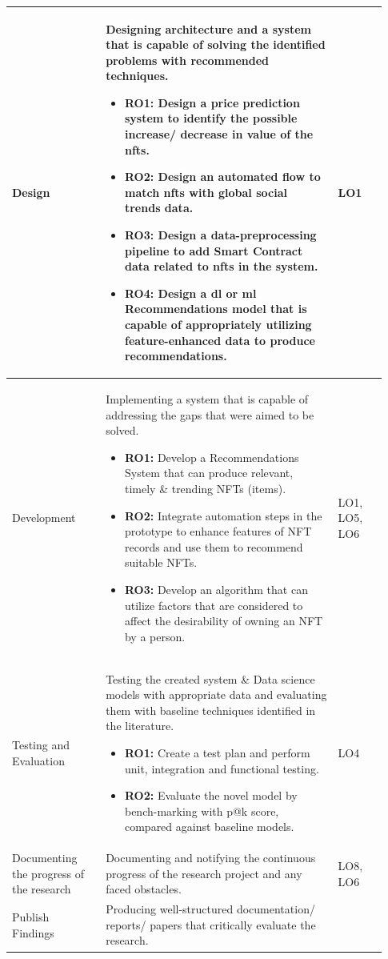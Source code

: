 \documentclass[a4paper, 12pt, oneside]{report}
\begin{document}
\begin{longtable}{| p{0.23\linewidth} | p{0.58\linewidth}| p{0.12\linewidth}|}
\hline
Design & Designing architecture and a system that is capable of solving the identified problems with recommended techniques.
\begin{itemize}
\item \textbf{RO1:} Design a price prediction system to identify the possible increase/ decrease in value of the \Gls{nft}s.
\item \textbf{RO2:} Design an automated flow to match \Gls{nft}s with global social trends data.
\item \textbf{RO3:} Design a data-preprocessing pipeline to add Smart Contract data related to \Gls{nft}s in the system.
\item \textbf{RO4:} Design a \Gls{dl} or \Gls{ml} Recommendations model that is capable of appropriately utilizing feature-enhanced data to produce recommendations.
\end{itemize}
& LO1 \\
\hline
Development & Implementing a system that is capable of addressing the gaps that were aimed to be solved. 
\begin{itemize}
\item \textbf{RO1:} Develop a Recommendations System that can produce relevant, timely \& trending NFTs (items).
\item \textbf{RO2:} Integrate automation steps in the prototype to enhance features of NFT records and use them to recommend suitable NFTs.
\item \textbf{RO3:} Develop an algorithm that can utilize factors that are considered to affect the desirability of owning an NFT by a person.
\end{itemize}
& LO1, LO5, LO6 \\
\hline
Testing and Evaluation & Testing the created system \& Data science models with appropriate data and evaluating them with baseline techniques identified in the literature. 
\begin{itemize}
\item \textbf{RO1:} Create a test plan and perform unit, integration and functional testing.
\item \textbf{RO2:} Evaluate the novel model by bench-marking with  \Gls{p@k} score, compared against baseline models.
\end{itemize}
& LO4 \\
\hline
Documenting the progress of the research & Documenting and notifying the continuous progress of the research project and any faced obstacles. 
& LO8, LO6 \\
\hline
Publish Findings & Producing well-structured documentation/ reports/ papers that critically evaluate the research.

\end{longtable}
\end{document}
